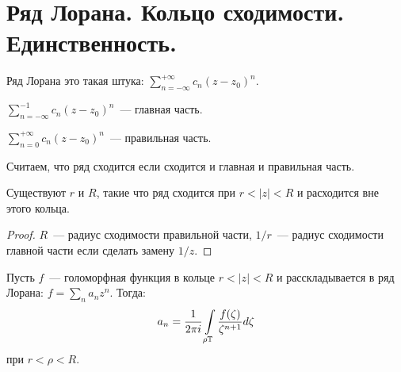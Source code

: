 \section{Ряд Лорана. Кольцо сходимости. Единственность.}

\begin{definition}
    Ряд Лорана это такая штука:
    $\sum\limits_{n=-\infty}^{+\infty} c_n(z-z_0)^n$.
\end{definition}

\begin{definition}
    $\sum\limits_{n=-\infty}^{-1} c_n(z-z_0)^n$~--- главная часть.
\end{definition}

\begin{definition}
    $\sum\limits_{n=0}^{+\infty} c_n(z-z_0)^n$~--- правильная часть.
\end{definition}

Считаем, что ряд сходится если сходится и главная и правильная часть.

\begin{property}
    Существуют $r$ и $R$, такие что ряд сходится
    при $r < |z| < R$ и расходится вне этого кольца.
\end{property}

\begin{proof}
    $R$~--- радиус сходимости правильной части,
    $1/r$~--- радиус сходимости главной части если сделать
    замену $1/z$.
\end{proof}

\begin{theorem}
    Пусть $f$~--- голоморфная функция в кольце $r < |z| < R$
    и расскладывается в ряд Лорана: $f = \sum\limits_n a_nz^n$.
    Тогда:
    $$a_n = \frac{1}{2\pi i} \int\limits_{\rho\mathbb{T}}\frac{f(\zeta)}{\zeta^{n+1}} d\zeta$$
    при $r < \rho < R$.
\end{theorem}

